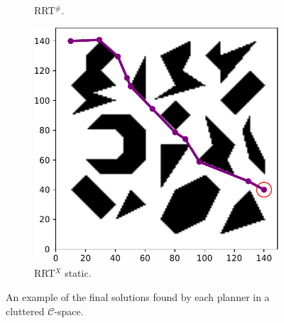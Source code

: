 \documentclass{ctuthesis}
\begin{document}
\begin{figure}[!ht]
\begin{subfigure}[t]{0.264\textwidth}
    \caption{RRT$^\#$.}
  \end{subfigure}  
  \begin{subfigure}[t]{0.264\textwidth}
    \includegraphics[width=\textwidth]{figChap5/Maze_clutter_final_solution_RRTXstatic.pdf}  
    \caption{RRT$^X$ static.}
  \end{subfigure}   
  \caption{An example of the final solutions found by each planner 
  in a cluttered $\mathcal{C}$-space.}
  \label{fig:final_sol_clutter}
\end{figure}

\clearpage
\end{document}
